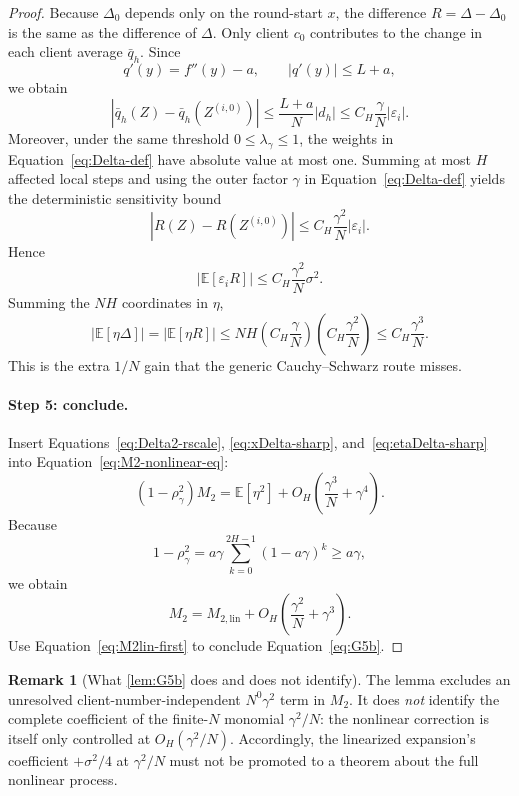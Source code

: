 \documentclass[11pt]{article}
\theoremstyle{definition}
\newtheorem{remark}[remark]{Remark}
\newcommand{\E}{\mathbb{E}}
\newcommand{\eps}{\varepsilon}
\begin{document}
\begin{proof}
Because $\Delta_0$ depends only on the round-start $x$, the difference $R=\Delta-\Delta_0$ is the same as the difference of $\Delta$. Only client $c_0$ contributes to the change in each client average $\bar q_h$. Since
\[
  q'(y)=f''(y)-a,
  \qquad |q'(y)|\le L+a,
\]
we obtain
\[
  |\bar q_h(Z)-\bar q_h(Z^{(i,0)})|
  \le \frac{L+a}{N}|d_h|
  \le C_H\frac{\gamma}{N}|\eps_i|.
\]
Moreover, under the same threshold $0\le\lambda_\gamma\le1$, the weights in Equation~\eqref{eq:Delta-def} have absolute value at most one. Summing at most $H$ affected local steps and using the outer factor $\gamma$ in Equation~\eqref{eq:Delta-def} yields the deterministic sensitivity bound
\begin{equation}
\label{eq:R-coordinate-Lipschitz}
  |R(Z)-R(Z^{(i,0)})|
  \le C_H\frac{\gamma^2}{N}|\eps_i|.
\end{equation}
Hence
\[
  |\E[\eps_iR]|\le C_H\frac{\gamma^2}{N}\sigma^2.
\]
Summing the $NH$ coordinates in $\eta$,
\begin{equation}
\label{eq:etaDelta-sharp}
  |\E[\eta\Delta]|
  =|\E[\eta R]|
  \le NH\left(C_H\frac{\gamma}{N}\right)
          \left(C_H\frac{\gamma^2}{N}\right)
  \le C_H\frac{\gamma^3}{N}.
\end{equation}
This is the extra $1/N$ gain that the generic Cauchy--Schwarz route misses.

\paragraph{Step 5: conclude.}
Insert Equations~\eqref{eq:Delta2-rscale}, \eqref{eq:xDelta-sharp}, and~\eqref{eq:etaDelta-sharp} into Equation~\eqref{eq:M2-nonlinear-eq}:
\[
  (1-\rho_\gamma^2)M_2
  =\E[\eta^2]+O_H\left(\frac{\gamma^3}{N}+\gamma^4\right).
\]
Because
\[
  1-\rho_\gamma^2
  =a\gamma\sum_{k=0}^{2H-1}(1-a\gamma)^k
  \ge a\gamma,
\]
we obtain
\[
  M_2=M_{2,\mathrm{lin}}+O_H\left(\frac{\gamma^2}{N}+\gamma^3\right).
\]
Use Equation~\eqref{eq:M2lin-first} to conclude Equation~\eqref{eq:G5b}.
\end{proof}

\begin{remark}[What \cref{lem:G5b} does and does not identify]
The lemma excludes an unresolved client-number-independent $N^0\gamma^2$ term in $M_2$. It does \emph{not} identify the complete coefficient of the finite-$N$ monomial $\gamma^2/N$: the nonlinear correction is itself only controlled at $O_H(\gamma^2/N)$. Accordingly, the linearized expansion's coefficient $+\sigma^2/4$ at $\gamma^2/N$ must not be promoted to a theorem about the full nonlinear process.
\end{remark}
\end{document}

